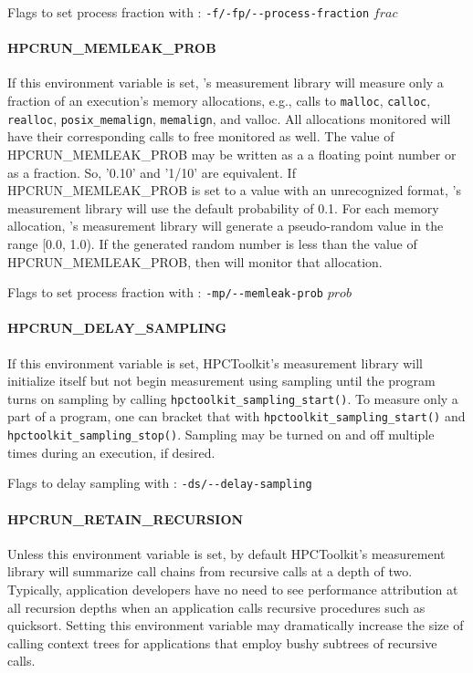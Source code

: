 \parg
Flags to set process fraction with \hpcrun: \verb|-f/-fp/--process-fraction| $frac$

\paragraph{HPCRUN\_MEMLEAK\_PROB}

If this environment variable is set, \HPCToolkit's measurement
library will measure only a fraction of an execution’s memory
allocations, e.g., calls to \verb|malloc|, \verb|calloc|, \verb|realloc|,
\verb|posix_memalign|, \verb|memalign|, and valloc. All allocations
monitored will have their corresponding calls to free monitored as
well. The value of HPCRUN\_MEMLEAK\_PROB may be written as a a
floating point number or as a fraction.  So, '0.10' and '1/10' are
equivalent. If HPCRUN\_MEMLEAK\_PROB is set to a value with an
unrecognized format, \HPCToolkit's measurement library will use the
default probability of 0.1. For each memory allocation, \HPCToolkit's
measurement library will generate a pseudo-random value in the range
[0.0, 1.0). If the generated random number is less than the value
of HPCRUN\_MEMLEAK\_PROB, then \HPCToolkit{} will monitor that
allocation.

\parg
Flags to set process fraction with \hpcrun: \verb|-mp/--memleak-prob| $prob$

\paragraph{HPCRUN\_DELAY\_SAMPLING}

\sloppy
If this environment variable is set, HPCToolkit's measurement library
will initialize itself but not begin measurement using sampling
until the program turns on sampling by calling
\verb|hpctoolkit_sampling_start()|. To measure only a part of a
program, one can bracket that with \verb|hpctoolkit_sampling_start()|
and \verb|hpctoolkit_sampling_stop()|. Sampling may be turned on
and off multiple times during an execution, if desired.

\parg
Flags to delay sampling with \hpcrun: \verb|-ds/--delay-sampling|

\paragraph{HPCRUN\_RETAIN\_RECURSION}

Unless this environment variable is set, by default HPCToolkit's
measurement library will summarize call chains from recursive calls
at a depth of two. Typically, application developers have no need
to see performance attribution at all recursion depths when an
application calls recursive procedures such as quicksort. Setting
this environment variable may dramatically increase the size of
calling context trees for applications that employ bushy subtrees
of recursive calls.

